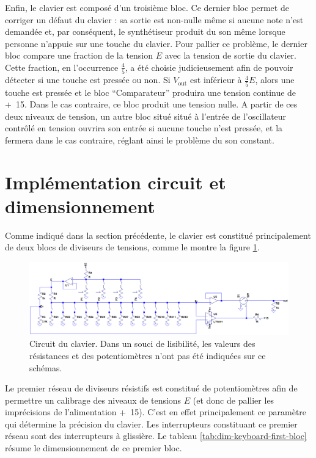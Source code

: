 Enfin, le clavier est composé d'un troisième bloc. Ce dernier bloc permet
de corriger un défaut du clavier : sa sortie est non-nulle même si aucune
note n'est demandée et, par conséquent, le synthétiseur produit du son
même lorsque personne n’appuie sur une touche du clavier. Pour pallier
ce problème, le dernier bloc compare une fraction de la tension $E$ avec la
tension de sortie du clavier. Cette fraction, en l’occurrence 
$\frac{4}{5}$, a été choisie judicieusement afin de pouvoir détecter
si une touche est pressée ou non. Si $V_{\text{out}}$ est inférieur à
$\frac{4}{5}E$, alors une touche est pressée et le bloc ``Comparateur''
produira une tension continue de \unit{+15}{\volt}. Dans le cas contraire,
ce bloc produit une tension nulle. A partir de ces deux niveaux de tension,
un autre bloc situé situé à l'entrée de l'oscillateur contrôlé en tension ouvrira
son entrée si aucune touche n'est pressée, et la fermera dans le cas contraire, 
réglant ainsi le problème du son constant.
 
\section{Implémentation circuit et dimensionnement}
Comme indiqué dans la section précédente, le clavier
est constitué principalement de deux blocs de diviseurs
de tensions, comme le montre la figure \ref{fig:keyboard-circuit}.

\begin{figure}[ht]
	\centering
	\includegraphics[scale=0.35]{img-keyboard/keyboard-circuit.png}
	\caption{Circuit du clavier. Dans un souci de lisibilité, les valeurs
	des résistances et des potentiomètres n'ont pas été indiquées sur ce
	schémas.}
	\label{fig:keyboard-circuit}
\end{figure}

Le premier réseau de diviseurs résistifs est constitué
de potentiomètres afin de permettre un calibrage des niveaux
de tensions $E$ (et donc de pallier les imprécisions de l'alimentation
\unit{+15}{\volt}). C'est en effet principalement ce paramètre qui
détermine la précision du clavier. Les interrupteurs constituant
ce premier réseau sont des interrupteurs à glissière.
Le tableau \ref{tab:dim-keyboard-first-bloc} résume
le dimensionnement de ce premier bloc.

